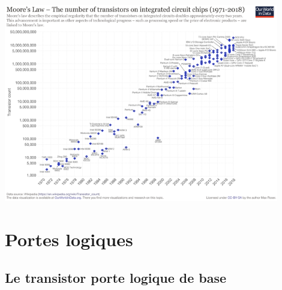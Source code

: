 \documentclass[
  11pt,
]{article}
\newcounter{logi}
\begin{document}
\begin{center}{}

\includegraphics[width=0.9\textwidth,height=\textheight]{images/640px-Moores_Law_Transistor_Count_1971-2018.png}\\

\end{center}

\hypertarget{portes-logiques}{%
\section{Portes logiques}\label{portes-logiques}}

\hypertarget{le-transistor-porte-logique-de-base}{%
\subsection{Le transistor porte logique de
base}\label{le-transistor-porte-logique-de-base}}
\end{document}
